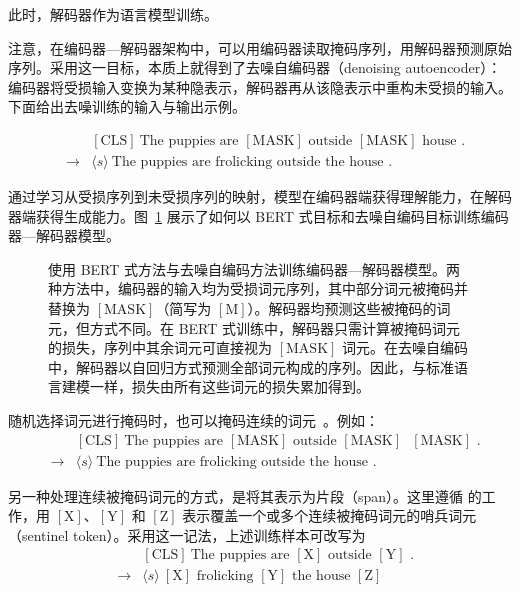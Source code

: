 \noindent 此时，解码器作为语言模型训练。

注意，在编码器—解码器架构中，可以用编码器读取掩码序列，用解码器预测原始序列。采用这一目标，本质上就得到了去噪自编码器（denoising autoencoder）：编码器将受损输入变换为某种隐表示，解码器再从该隐表示中重构未受损的输入。下面给出去噪训练的输入与输出示例。

\begin{eqnarray}
&     & \mathrm{[CLS]}\ \textrm{The puppies are $\mathrm{[MASK]}$ outside $\mathrm{[MASK]}$ house .} \nonumber \\
& \to & \langle s \rangle\ \textrm{The puppies are frolicking outside the house .} \nonumber
\end{eqnarray}

\noindent 通过学习从受损序列到未受损序列的映射，模型在编码器端获得理解能力，在解码器端获得生成能力。图~\ref{fig:encoder-decoder-masked-lm} 展示了如何以 BERT 式目标和去噪自编码目标训练编码器—解码器模型。

\begin{figure}[!t]
\centering

\caption{使用 BERT 式方法与去噪自编码方法训练编码器—解码器模型。两种方法中，编码器的输入均为受损词元序列，其中部分词元被掩码并替换为 $\mathrm{[MASK]}$（简写为 $\mathrm{[M]}$）。解码器均预测这些被掩码的词元，但方式不同。在 BERT 式训练中，解码器只需计算被掩码词元的损失，序列中其余词元可直接视为 $\mathrm{[MASK]}$ 词元。在去噪自编码中，解码器以自回归方式预测全部词元构成的序列。因此，与标准语言建模一样，损失由所有这些词元的损失累加得到。}
\label{fig:encoder-decoder-masked-lm}
\end{figure}

随机选择词元进行掩码时，也可以掩码连续的词元~\cite{joshi-etal:2020spanbert}。例如：
\begin{eqnarray}
&     & \mathrm{[CLS]}\ \textrm{The puppies are $\mathrm{[MASK]}$ outside $\mathrm{[MASK]}$ $\mathrm{[MASK]}$ .} \nonumber \\
& \to & \langle s \rangle\ \textrm{The puppies are frolicking outside the house .} \nonumber
\end{eqnarray}

另一种处理连续被掩码词元的方式，是将其表示为片段（span）。这里遵循 \citet{raffel-etal:2020exploring} 的工作，用 $\mathrm{[X]}$、$\mathrm{[Y]}$ 和 $\mathrm{[Z]}$ 表示覆盖一个或多个连续被掩码词元的哨兵词元（sentinel token）。采用这一记法，上述训练样本可改写为
\begin{eqnarray}
&     & \mathrm{[CLS]}\ \textrm{The puppies are $\mathrm{[X]}$ outside $\mathrm{[Y]}$ .} \nonumber \\
& \to & \langle s \rangle\ \textrm{$\mathrm{[X]}$ frolicking $\mathrm{[Y]}$ the house $\mathrm{[Z]}$} \nonumber
\end{eqnarray}


